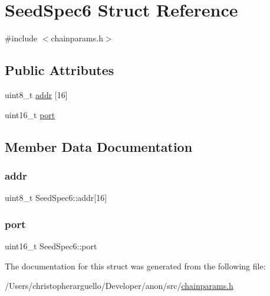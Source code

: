\hypertarget{struct_seed_spec6}{}\section{Seed\+Spec6 Struct Reference}
\label{struct_seed_spec6}


{\ttfamily \#include $<$chainparams.\+h$>$}

\subsection*{Public Attributes}
\begin{DoxyCompactItemize}
\item 
uint8\+\_\+t \mbox{\hyperlink{struct_seed_spec6_ad08d58f6fcd19c2bdb1e24cde0791cbc}{addr}} \mbox{[}16\mbox{]}
\item 
uint16\+\_\+t \mbox{\hyperlink{struct_seed_spec6_a48fdfc3ed14e7676b500bab2e2bcc643}{port}}
\end{DoxyCompactItemize}


\subsection{Member Data Documentation}
\mbox{\label{struct_seed_spec6_ad08d58f6fcd19c2bdb1e24cde0791cbc}} 
\subsubsection{\texorpdfstring{addr}{addr}}
{\footnotesize\ttfamily uint8\+\_\+t Seed\+Spec6\+::addr\mbox{[}16\mbox{]}}

\mbox{\label{struct_seed_spec6_a48fdfc3ed14e7676b500bab2e2bcc643}} 
\subsubsection{\texorpdfstring{port}{port}}
{\footnotesize\ttfamily uint16\+\_\+t Seed\+Spec6\+::port}



The documentation for this struct was generated from the following file\+:\begin{DoxyCompactItemize}
\item 
/\+Users/christopherarguello/\+Developer/anon/src/\mbox{\hyperlink{chainparams_8h}{chainparams.\+h}}\end{DoxyCompactItemize}
